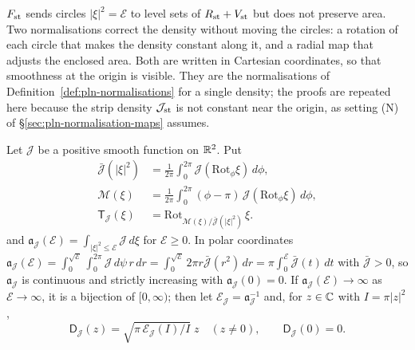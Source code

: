 $F_{\rm st}$ sends circles $|\xi|^2=\mathcal E$ to level sets of $R_{\rm st}+V_{\rm st}$ but does not preserve area. Two
normalisations correct the density without moving the circles: a rotation of each circle that makes the density
constant along it, and a radial map that adjusts the enclosed area. Both are written in Cartesian coordinates, so
that smoothness at the origin is visible. They are the normalisations of Definition~\ref{def:pln-normalisations} for a single density; the
proofs are repeated here because the strip density $\mathcal J_{\rm st}$ is not constant near the origin, as setting (N)
of \S\ref{sec:pln-normalisation-maps} assumes.

\begin{definition}\label{def:str-normalisation}
Let $\mathcal J$ be a positive smooth function on $\mathbb{R}^2$. Put
\begin{align*}
 \bar{\mathcal J}(|\xi|^2)&=\frac1{2\pi}\int_0^{2\pi}\mathcal J(\mathrm{Rot}_\phi\xi)\,d\phi,\\
 \mathcal M(\xi)&=\frac1{2\pi}\int_0^{2\pi}(\phi-\pi)\,\mathcal J(\mathrm{Rot}_\phi\xi)\,d\phi,\\
 \mathsf T_{\mathcal J}(\xi)&=\mathrm{Rot}_{\mathcal M(\xi)/\bar{\mathcal J}(|\xi|^2)}\,\xi .
\end{align*}
and $\mathfrak a_{\mathcal J}(\mathcal E)=\int_{|\xi|^2\le\mathcal E}\mathcal J\,d\xi$ for $\mathcal E\ge0$. In polar coordinates
$\mathfrak a_{\mathcal J}(\mathcal E)=\int_0^{\sqrt{\mathcal E}}\int_0^{2\pi}\mathcal J\,d\psi\,r\,dr
=\int_0^{\sqrt{\mathcal E}}2\pi r\bar{\mathcal J}(r^2)\,dr=\pi\int_0^{\mathcal E}\bar{\mathcal J}(t)\,dt$ with $\bar{\mathcal J}>0$, so
$\mathfrak a_{\mathcal J}$ is continuous and strictly increasing with $\mathfrak a_{\mathcal J}(0)=0$. If
$\mathfrak a_{\mathcal J}(\mathcal E)\to\infty$ as $\mathcal E\to\infty$, it is a bijection of $[0,\infty)$; then let
$\mathcal E_{\mathcal J}=\mathfrak a_{\mathcal J}^{-1}$ and, for $z\in\mathbb{C}$ with $I=\pi|z|^2$,
\[
 \mathsf D_{\mathcal J}(z)=\sqrt{\pi\,\mathcal E_{\mathcal J}(I)/I}\;z\quad(z\ne0),\qquad \mathsf D_{\mathcal J}(0)=0 .
\]
\end{definition}

